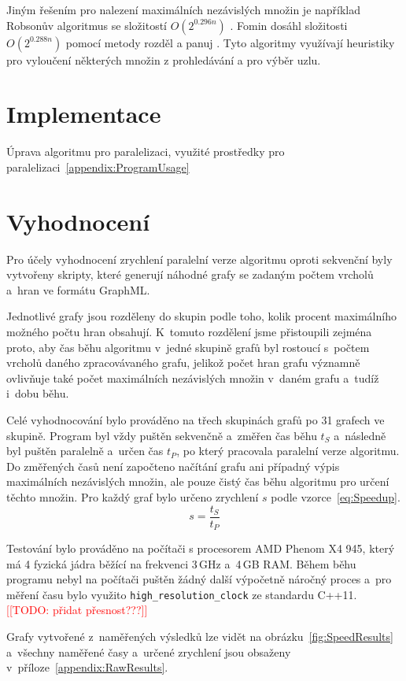 \documentclass[12pt]{article}
\newcommand{\todo}[1]{\textcolor{red}{[[TODO: #1]]}}
\begin{document}
Jiným řešením pro nalezení maximálních nezávislých množin je například Robsonův algoritmus se složitostí \(O(2^{0.296n})\) \cite{robson}. Fomin dosáhl složitosti \(O(2^{0.288n})\) pomocí metody rozděl a panuj \cite{fomin}. Tyto algoritmy využívají heuristiky pro vyloučení některých množin z prohledávání a pro výběr uzlu.  

\section{Implementace}
Úprava algoritmu pro paralelizaci, využité prostředky pro paralelizaci~\ref{appendix:ProgramUsage}


\section{Vyhodnocení}
Pro účely vyhodnocení zrychlení paralelní verze algoritmu oproti sekvenční byly vytvořeny skripty, které generují náhodné grafy se zadaným počtem vrcholů a~hran ve formátu GraphML. 

Jednotlivé grafy jsou rozděleny do skupin podle toho, kolik procent maximálního možného počtu hran obsahují. K~tomuto rozdělení jsme přistoupili zejména proto, aby čas běhu algoritmu v~jedné skupině grafů byl rostoucí s~počtem vrcholů daného zpracovávaného grafu, jelikož počet hran grafu významně ovlivňuje také počet maximálních nezávislých množin v~daném grafu a~tudíž i~dobu běhu. 

Celé vyhodnocování bylo prováděno na třech skupinách grafů po 31 grafech ve skupině. Program byl vždy puštěn sekvenčně a~změřen čas běhu $t_S$ a~následně byl puštěn paralelně a~určen čas $t_P$, po který pracovala paralelní verze algoritmu. Do změřených časů není započteno načítání grafu ani případný výpis maximálních nezávislých množin, ale pouze čistý čas běhu algoritmu pro určení těchto množin. Pro každý graf bylo určeno zrychlení $s$ podle vzorce~\ref{eq:Speedup}.
\begin{equation}
    s = \frac{t_S}{t_P} \label{eq:Speedup}
\end{equation}

Testování bylo prováděno na počítači s procesorem AMD Phenom X4 945, který má 4 fyzická jádra běžící na frekvenci 3\,GHz a~4\,GB RAM. Během běhu programu nebyl na počítači puštěn žádný další výpočetně náročný proces a~pro měření času bylo využito \texttt{high\_resolution\_clock} ze standardu C++11. \todo{přidat přesnost???}

Grafy vytvořené z~naměřených výsledků lze vidět na obrázku~\ref{fig:SpeedResults} a~všechny naměřené časy a~určené zrychlení jsou obsaženy v~příloze~\ref{appendix:RawResults}.
\end{document}
